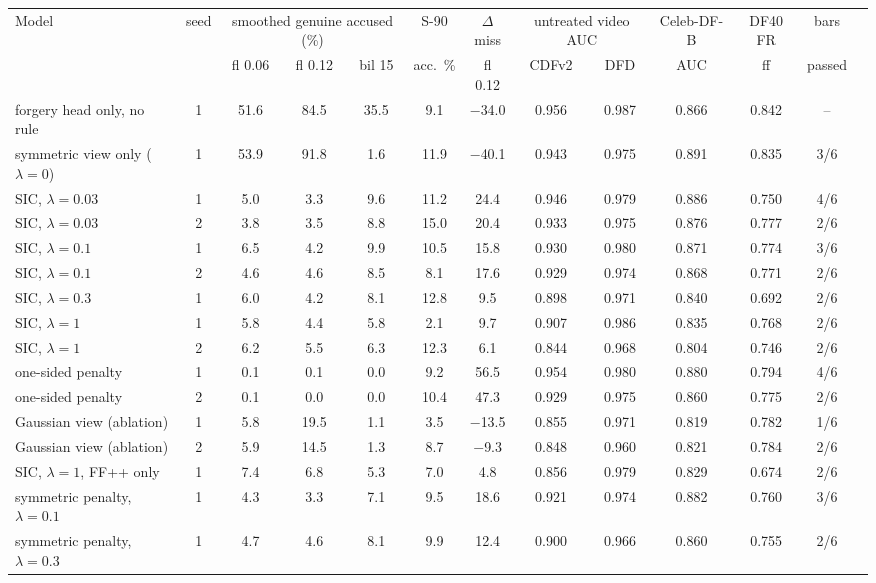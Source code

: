 \begin{tabular}{@{}lcccccccccccc@{}}
\toprule
Model & seed & \multicolumn{3}{c}{smoothed genuine accused (\%)} & S-90 & $\Delta$miss & \multicolumn{2}{c}{untreated video AUC} & Celeb-DF-B & DF40 FR & bars \\
 & & fl 0.06 & fl 0.12 & bil 15 & acc.\ \% & fl 0.12 & CDFv2 & DFD & AUC & ff & passed \\
\midrule
forgery head only, no rule & 1 & 51.6 & 84.5 & 35.5 & 9.1 & $-$34.0 & 0.956 & 0.987 & 0.866 & 0.842 & -- \\
\midrule
symmetric view only ($\lambda=0$) & 1 & 53.9 & 91.8 & 1.6 & 11.9 & $-$40.1 & 0.943 & 0.975 & 0.891 & 0.835 & 3/6 \\
SIC, $\lambda=0.03$ & 1 & 5.0 & 3.3 & 9.6 & 11.2 & 24.4 & 0.946 & 0.979 & 0.886 & 0.750 & 4/6 \\
SIC, $\lambda=0.03$ & 2 & 3.8 & 3.5 & 8.8 & 15.0 & 20.4 & 0.933 & 0.975 & 0.876 & 0.777 & 2/6 \\
SIC, $\lambda=0.1$ & 1 & 6.5 & 4.2 & 9.9 & 10.5 & 15.8 & 0.930 & 0.980 & 0.871 & 0.774 & 3/6 \\
SIC, $\lambda=0.1$ & 2 & 4.6 & 4.6 & 8.5 & 8.1 & 17.6 & 0.929 & 0.974 & 0.868 & 0.771 & 2/6 \\
SIC, $\lambda=0.3$ & 1 & 6.0 & 4.2 & 8.1 & 12.8 & 9.5 & 0.898 & 0.971 & 0.840 & 0.692 & 2/6 \\
SIC, $\lambda=1$ & 1 & 5.8 & 4.4 & 5.8 & 2.1 & 9.7 & 0.907 & 0.986 & 0.835 & 0.768 & 2/6 \\
SIC, $\lambda=1$ & 2 & 6.2 & 5.5 & 6.3 & 12.3 & 6.1 & 0.844 & 0.968 & 0.804 & 0.746 & 2/6 \\
one-sided penalty & 1 & 0.1 & 0.1 & 0.0 & 9.2 & 56.5 & 0.954 & 0.980 & 0.880 & 0.794 & 4/6 \\
one-sided penalty & 2 & 0.1 & 0.0 & 0.0 & 10.4 & 47.3 & 0.929 & 0.975 & 0.860 & 0.775 & 2/6 \\
Gaussian view (ablation) & 1 & 5.8 & 19.5 & 1.1 & 3.5 & $-$13.5 & 0.855 & 0.971 & 0.819 & 0.782 & 1/6 \\
Gaussian view (ablation) & 2 & 5.9 & 14.5 & 1.3 & 8.7 & $-$9.3 & 0.848 & 0.960 & 0.821 & 0.784 & 2/6 \\
SIC, $\lambda=1$, FF++ only & 1 & 7.4 & 6.8 & 5.3 & 7.0 & 4.8 & 0.856 & 0.979 & 0.829 & 0.674 & 2/6 \\
symmetric penalty, $\lambda=0.1$ & 1 & 4.3 & 3.3 & 7.1 & 9.5 & 18.6 & 0.921 & 0.974 & 0.882 & 0.760 & 3/6 \\
symmetric penalty, $\lambda=0.3$ & 1 & 4.7 & 4.6 & 8.1 & 9.9 & 12.4 & 0.900 & 0.966 & 0.860 & 0.755 & 2/6 \\

\end{tabular}
